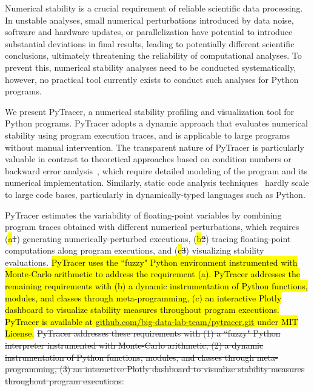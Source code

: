 \documentclass[10pt,journal,compsoc]{IEEEtran}
\newcommand{\pytracer}[0]{PyTracer\xspace}
\DeclareRobustCommand{\add}[1]{\sethlcolor{lightgreen}\hl{#1}}
\DeclareRobustCommand{\remove}[1]{\textcolor{lightred}{\sout{#1}}}
\DeclareRobustCommand{\addCite}[1]{\textcolor{lightgreen}{\mbox{#1}}}
\begin{document}
Numerical stability is a crucial requirement of reliable scientific data
processing. In unstable analyses, small numerical perturbations introduced by
data noise, software and hardware updates, or parallelization have potential to
introduce substantial deviations in final results, leading to potentially
different scientific conclusions, ultimately threatening the reliability of
computational analyses. To prevent this, numerical stability analyses need to be
conducted systematically, however, no practical tool currently exists to conduct
such analyses for Python programs.

We present PyTracer, a numerical stability profiling and visualization tool for
Python programs. \pytracer adopts a dynamic approach that evaluates numerical
stability using program execution traces, and is applicable to large programs
without manual intervention. The transparent nature of \pytracer is particularly
valuable in contrast to theoretical approaches based on condition numbers or
backward error analysis~\addCite{\cite{higham2002accuracy}}, which require
detailed modeling of the program and its numerical implementation. Similarly,
static code analysis techniques~\addCite{\cite{goubault2006static}} hardly scale
to large code bases, particularly in dynamically-typed languages such as Python.

\pytracer estimates the variability of floating-point variables by combining
program traces obtained with different numerical perturbations, which requires
(\add{a}\remove{1}) generating numerically-perturbed executions,
(\add{b}\remove{2}) tracing floating-point computations along program
executions, and (\add{c}\remove{3}) visualizing stability evaluations.
\add{PyTracer uses the ``fuzzy" Python environment instrumented with Monte-Carlo
    arithmetic to address the requirement (a). \mbox{\pytracer} addresses the
    remaining requirements with (b) a dynamic instrumentation of Python functions,
    modules, and classes through meta-programming, (c) an interactive Plotly
    dashboard to visualize stability measures throughout program executions.
    \mbox{\pytracer} is available at
    \mbox{\href{https://github.com/big-data-lab-team/pytracer.git}{github.com/big-data-lab-team/pytracer.git}}
    under MIT License.} \remove{\mbox{\pytracer} addresses these requirements with
    (1) a ``fuzzy" Python interpreter instrumented with Monte-Carlo arithmetic, (2)
    a dynamic instrumentation of Python functions, modules, and classes through
    meta-programming, (3) an interactive Plotly dashboard to visualize stability
    measures throughout program executions. }
\end{document}
